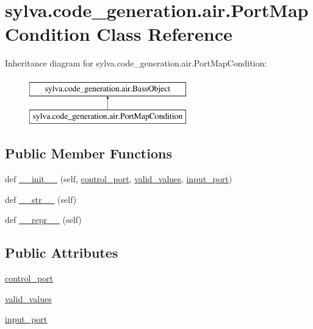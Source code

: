 \hypertarget{classsylva_1_1code__generation_1_1air_1_1_port_map_condition}{}\section{sylva.\+code\+\_\+generation.\+air.\+Port\+Map\+Condition Class Reference}
\label{classsylva_1_1code__generation_1_1air_1_1_port_map_condition}
Inheritance diagram for sylva.\+code\+\_\+generation.\+air.\+Port\+Map\+Condition\+:\begin{figure}[H]
\begin{center}
\leavevmode
\includegraphics[height=2.000000cm]{classsylva_1_1code__generation_1_1air_1_1_port_map_condition}
\end{center}
\end{figure}
\subsection*{Public Member Functions}
\begin{DoxyCompactItemize}
\item 
def \hyperlink{classsylva_1_1code__generation_1_1air_1_1_port_map_condition_ae9d4fe40feaa0466075ab2ea74bdb7ce}{\+\_\+\+\_\+init\+\_\+\+\_\+} (self, \hyperlink{classsylva_1_1code__generation_1_1air_1_1_port_map_condition_a8144ca86c7e62e6bc09ab9b21322e146}{control\+\_\+port}, \hyperlink{classsylva_1_1code__generation_1_1air_1_1_port_map_condition_a98936107f0135352da9608e71fcdf69e}{valid\+\_\+values}, \hyperlink{classsylva_1_1code__generation_1_1air_1_1_port_map_condition_a88a75f6cca1f9c1db5bd699c6e82f191}{input\+\_\+port})
\item 
def \hyperlink{classsylva_1_1code__generation_1_1air_1_1_bass_object_a2c164720220479369c29db97b67aabe8}{\+\_\+\+\_\+str\+\_\+\+\_\+} (self)
\item 
def \hyperlink{classsylva_1_1code__generation_1_1air_1_1_bass_object_a17548b84b2a55240a429506aed418292}{\+\_\+\+\_\+repr\+\_\+\+\_\+} (self)
\end{DoxyCompactItemize}
\subsection*{Public Attributes}
\begin{DoxyCompactItemize}
\item 
\hyperlink{classsylva_1_1code__generation_1_1air_1_1_port_map_condition_a8144ca86c7e62e6bc09ab9b21322e146}{control\+\_\+port}
\item 
\hyperlink{classsylva_1_1code__generation_1_1air_1_1_port_map_condition_a98936107f0135352da9608e71fcdf69e}{valid\+\_\+values}
\item 
\hyperlink{classsylva_1_1code__generation_1_1air_1_1_port_map_condition_a88a75f6cca1f9c1db5bd699c6e82f191}{input\+\_\+port}
\end{DoxyCompactItemize}


